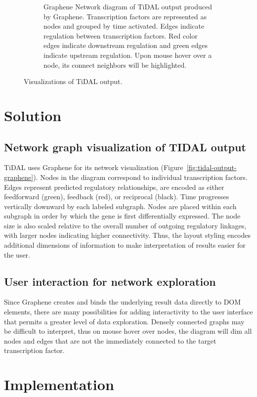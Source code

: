 \begin{figure}
\begin{subfigure}[b]{\textwidth}
    \caption{
      Graphene Network diagram of TiDAL output produced by Graphene.
      Transcription factors are represented as nodes and grouped by time activated.
      Edges indicate regulation between transcription factors.
      Red color edges indicate downstream regulation and green edges indicate upstream regulation.
      Upon  mouse hover over a node, its connect neighbors will be highlighted.
    }
    \label{Figure:tidal-output-graphene}
  \end{subfigure}
  \caption{Visualizations of TiDAL output.}
  \label{fig:tidal-output}
\end{figure}

\section{Solution}
\subsection{Network graph visualization of TIDAL output}

TiDAL uses Graphene for its network visualization (Figure~\ref{fig:tidal-output-graphene}).
Nodes in the diagram correspond to individual transcription factors.
Edges represent predicted regulatory relationships, are encoded as either feedforward (green), feedback (red), or reciprocal (black).
Time progresses vertically downward by each labeled subgraph. 
Nodes are placed within each subgraph in order by which the gene is first differentially expressed.
The node size is also scaled relative to the overall number of outgoing regulatory linkages, with larger nodes indicating higher connectivity.
Thus, the layout styling encodes additional dimensions of information to make interpretation of results easier for the user.

\subsection{User interaction for network exploration}

Since Graphene creates and binds the underlying result data directly to DOM elements, there are many possibilities for adding interactivity to the user interface that permits a greater level of data exploration.
Densely connected graphs may be difficult to interpret, thus on mouse hover over nodes, the diagram will dim all nodes and edges that are not the immediately connected to the target transcription factor.


\section{Implementation}
